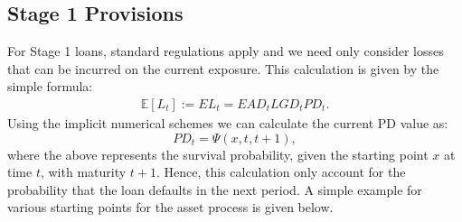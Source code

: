 \documentclass[11pt,reqno]{article}
\theoremstyle{definition}
\begin{document}
\subsection{Stage 1 Provisions}
For Stage 1 loans, standard regulations apply and we need only consider losses that can be incurred on the current exposure. This calculation is given by the simple formula:
\begin{eqnarray}\label{stage_1_losses}
 \mathbb{E}[L_t]:=EL_t = EAD_t LGD_t PD_t.
\end{eqnarray}
Using the implicit numerical schemes we can calculate the current PD value as:
$$ PD_t = \Psi(x,t,t+1),$$ where the above represents the survival probability, given the starting point $x$ at time $t$, with maturity $t+1$. Hence, this calculation only account for the probability that the loan defaults in the next period. A simple example for various starting points for the asset process is given below.
\end{document}
